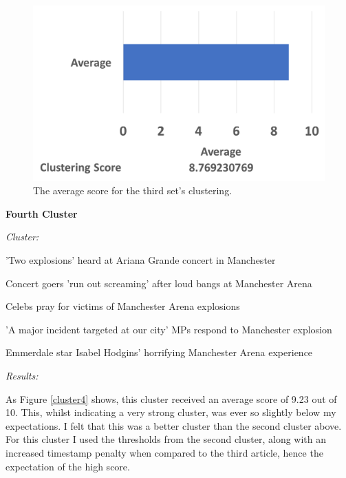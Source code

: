 \documentclass[12pt]{article}
\begin{document}
\begin{figure}[ht!]
  \centering
    \includegraphics[scale=0.6]{cluster3score.png}
   \caption[The average score for a cluster]{The average score for the third set's clustering.}
   \label{cluster3}
\end{figure} 

\textbf{Fourth Cluster}

\begin{mdframed}

\emph{Cluster:}

'Two explosions' heard at Ariana Grande concert in Manchester

Concert goers 'run out screaming' after loud bangs at Manchester Arena

Celebs pray for victims of Manchester Arena explosions

'A major incident targeted at our city' MPs respond to Manchester explosion

Emmerdale star Isabel Hodgins' horrifying Manchester Arena experience \\

\end{mdframed}

\emph{Results:}

As Figure \ref{cluster4} shows, this cluster received an average score of 9.23 out of 10. This, whilst indicating a very strong cluster, was ever so slightly below my expectations. I felt that this was a better cluster than the second cluster above. For this cluster I used the thresholds from the second cluster, along with an increased timestamp penalty when compared to the third article, hence the expectation of the high score. \\
\end{document}
